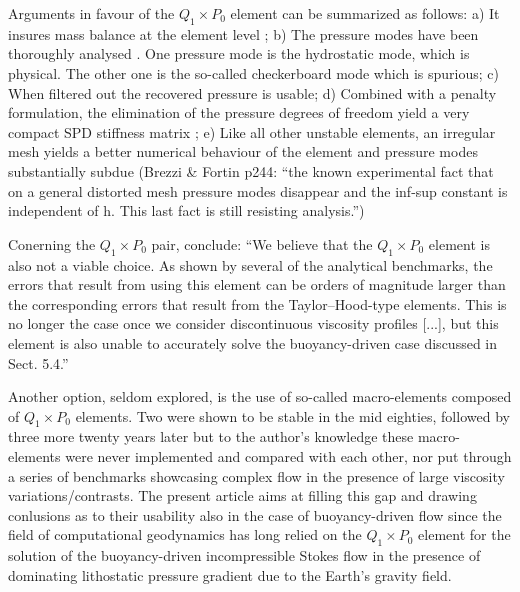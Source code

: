 \documentclass[a4paper]{article}
\begin{document}
Arguments in favour of the $Q_1\times P_0$ element can be summarized as follows:
a) It insures mass balance at the element level \cite[p459]{grsa};
b) The pressure modes have been thoroughly analysed \cite{sagl81a,sagl81b,grsi94}.
One pressure mode is the hydrostatic mode, which is  
physical. The other one is the so-called checkerboard mode which is spurious;
c) When filtered out \cite{chpc95} the recovered pressure is usable;
d) Combined with a penalty formulation, the elimination of the pressure degrees of freedom 
yield a very compact SPD stiffness matrix \cite{zigo75,hulb79,zina82,redd82,odks82};
e) Like all other unstable elements, an irregular mesh yields a 
better numerical behaviour of the element \cite{qizh07} and pressure modes substantially subdue
(Brezzi \& Fortin p244: ``the known experimental fact that on a general
distorted mesh pressure modes disappear and the inf-sup constant is independent of h. 
This last fact is still resisting analysis.'')

Conerning the $Q_1 \times P_0$ pair, \cite{thba22} conclude:
``We believe that the $Q_1 \times P_0$ element is also not a viable
choice. As shown by several of the analytical benchmarks, the errors that result from using this element can
be orders of magnitude larger than the corresponding
errors that result from the Taylor–Hood-type elements.
This is no longer the case once we consider discontinuous viscosity profiles [...], but this element
is also unable to accurately solve the buoyancy-driven
case discussed in Sect. 5.4.''

Another option, seldom explored, is the use of so-called macro-elements composed of $Q_1\times P_0$ elements. 
Two were shown to be stable in the mid eighties\cite{leta81,sten84}, followed by three more twenty years
later\cite{qizh07} but to the author's knowledge these macro-elements were never 
implemented and compared with each other, nor put through a series of benchmarks showcasing complex flow in the 
presence of large viscosity variations/contrasts. The present article aims at 
filling this gap and drawing conlusions as to their usability also in the case of buoyancy-driven flow
since the field of computational geodynamics has long relied on the $Q_1\times P_0$ element for the 
solution of the buoyancy-driven incompressible Stokes flow in the presence of 
dominating lithostatic pressure gradient due to the Earth's gravity field.  


\end{document}
